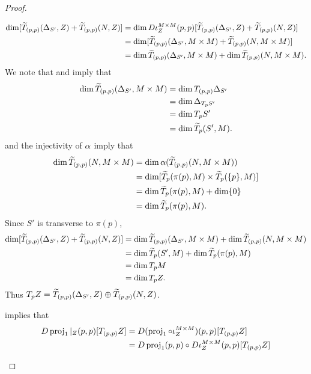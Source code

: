 \documentclass{book}
\begin{document}
\begin{proof}
\begin{enumerate}
\begin{enumerate}
\begin{align*}
					\dim [\widetilde{T}_{(p,p)} (\Delta_{S'}, Z) + \widetilde{T}_{(p,p)} (N, Z)]
					& = \dim D \iota_Z^{M \times M}(p,p)[\widetilde{T}_{(p,p)} (\Delta_{S'}, Z) + \widetilde{T}_{(p,p)} (N, Z)] \\
					& = \dim [\widetilde{T}_{(p,p)} (\Delta_{S'}, M \times M) + \widetilde{T}_{(p,p)} (N, M \times M)] \\
					& = \dim \widetilde{T}_{(p,p)} (\Delta_{S'}, M \times M) + \dim \widetilde{T}_{(p,p)} (N, M \times M).
				\end{align*}
				We note that  and  imply that
				\begin{align*}
					\dim \widetilde{T}_{(p,p)} (\Delta_{S'}, M \times M)
					& = \dim T_{(p,p)} \Delta_{S'} \\
					& = \dim \Delta_{T_p S'} \\
					& = \dim T_p S' \\
					& = \dim \widetilde{T}_{p} (S', M).
				\end{align*} 
				  and the injectivity of $\alpha$ imply that
				\begin{align*}
					\dim \widetilde{T}_{(p,p)}(N, M \times M)
					& = \dim \alpha(\widetilde{T}_{(p,p)}(N, M \times M)) \\
					& = \dim [\widetilde{T}_p (\pi(p), M) \times \widetilde{T}_p (\{p\}, M)] \\
					& = \dim \widetilde{T}_p (\pi(p), M) + \dim \{0\} \\
					& = \dim \widetilde{T}_p (\pi(p), M).
				\end{align*}
				Since $S'$ is transverse to $\pi(p)$, 
				\begin{align*}
					\dim [\widetilde{T}_{(p,p)} (\Delta_{S'}, Z) + \widetilde{T}_{(p,p)} (N, Z)]
					& = \dim \widetilde{T}_{(p,p)} (\Delta_{S'}, M \times M) + \dim \widetilde{T}_{(p,p)} (N, M \times M) \\
					& = \dim \widetilde{T}_p (S', M) + \dim \widetilde{T}_p (\pi(p), M) \\
					& = \dim T_p M \\
					& = \dim T_p Z.
				\end{align*}
				Thus $T_p Z = \widetilde{T}_{(p,p)} (\Delta_{S'}, Z) \oplus \widetilde{T}_{(p,p)} (N, Z)$.
			\end{enumerate}
			 implies that 
			\begin{align*}
				D \prj_1|_Z(p,p)[T_{(p,p)} Z] 
				& = D (\prj_1 \circ \iota_Z^{M \times M})(p,p)[T_{(p,p)} Z] \\
				& = D \prj_1(p,p) \circ D \iota_Z^{M \times M}(p,p) [T_{(p,p)} Z] \\

\end{align*}
\end{enumerate}
\end{proof}
\end{document}
